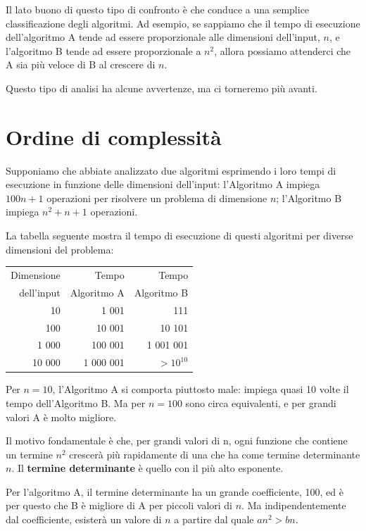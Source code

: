 \documentclass[10pt]{book}
\begin{document}
Il lato buono di questo tipo di confronto è che conduce a una semplice classificazione degli algoritmi. Ad esempio, se sappiamo che il tempo di esecuzione dell'algoritmo A tende ad essere proporzionale alle dimensioni dell'input, $n$, e l'algoritmo B tende ad essere proporzionale a $n^2$, allora possiamo attenderci che A sia più veloce di B al crescere di $n$.

Questo tipo di analisi ha alcune avvertenze, ma ci torneremo più avanti.


\section{Ordine di complessità}

Supponiamo che abbiate analizzato due algoritmi esprimendo i loro tempi di esecuzione in funzione delle dimensioni dell'input: l'Algoritmo A impiega $100n+1$ operazioni per risolvere un problema di dimensione $n$; l'Algoritmo B impiega $n^2 + n + 1$ operazioni.

La tabella seguente mostra il tempo di esecuzione di questi algoritmi per diverse dimensioni del problema:

\begin{tabular}{|r|r|r|}
\hline
Dimensione &   Tempo          & Tempo \\
dell'input	   &   Algoritmo A    & Algoritmo B \\
\hline
10        &   1 001           & 111         \\
100       &   10 001          & 10 101         \\
1 000     &   100 001         & 1 001 001         \\
10 000    &   1 000 001       & $> 10^{10}$         \\
\hline
\end{tabular}

Per $n=10$, l'Algoritmo A si comporta piuttosto male: impiega quasi 10 volte il tempo dell'Algoritmo B.  Ma per $n=100$ sono circa equivalenti, e per grandi valori A è molto migliore.

Il motivo fondamentale è che, per grandi valori di n, ogni funzione che contiene un termine $n^2$ crescerà più rapidamente di una che ha come termine determinante $n$.  Il {\bf termine determinante} è quello con il più alto esponente.

Per l'algoritmo A, il termine determinante ha un grande coefficiente, 100, ed è per questo che B è migliore di A per piccoli valori di $n$.  Ma indipendentemente dal coefficiente, esisterà un valore di $n$ a partire dal quale
$a n^2 > b n$.
\end{document}
